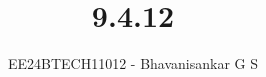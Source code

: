 \documentclass[journal]{IEEEtran}
\begin{document}

\vspace{3cm}

\title{9.4.12}
\author{EE24BTECH11012 - Bhavanisankar G S}
{\let\newpage\relax\maketitle}

\renewcommand{\thefigure}{\theenumi}
\renewcommand{\thetable}{\theenumi}
\setlength{\intextsep}{10pt} %


\renewcommand{\thetable}{\theenumi}
\end{document}
